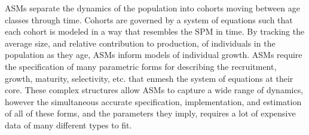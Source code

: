
%

%
ASMs separate the dynamics of the population into cohorts moving between age 
classes through time. %
Cohorts are governed by a system of equations %
such that each cohort is modeled in a way that resembles the SPM in time. By
tracking the average size, and relative contribution to production, of individuals %
in the population as they age, ASMs inform models of individual growth. ASMs 
require the specification of many parametric forms for describing the recruitment, 
growth, maturity, selectivity, etc. that enmesh the system of equations at their 
core. These complex structures allow ASMs to capture a wide range of dynamics, however 
the simultaneous accurate specification, implementation, and estimation of all of 
these forms, and the parameters they imply, requires a lot of expensive data 
of many different types to fit. 
%


